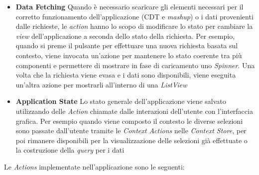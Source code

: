 \begin{itemize}
	\item \textbf{Data Fetching}
	Quando è necessario scaricare gli elementi necessari per il corretto funzionamento dell'applicazione (CDT e \emph{mashup}) o i dati provenienti dalle richieste, le \emph{action} hanno lo scopo di modificare lo stato per cambiare la \emph{view} dell'applicazione a seconda dello stato della richiesta.
	Per esempio, quando si preme il pulsante per effettuare una nuova richiesta basata sul contesto, viene invocata un'azione per mantenere lo stato coerente tra più componenti e permettere di mostrare in fase di caricamento uno \emph{Spinner}. Una volta che la richiesta viene evasa e i dati sono disponibili, viene eseguita un’altra azione per mostrarli all’interno di una \emph{ListView}
	\item \textbf{Application State}
	Lo stato generale dell'applicazione viene salvato utilizzando delle \emph{Action} chiamate dalle interazioni dell'utente con l'interfaccia grafica. Per esempio quando viene composto il contesto le diverse selezioni sono passate dall'utente tramite le \emph{Context Actions} nelle \emph{Context Store}, per poi rimanere disponibili per la visualizzazione delle selezioni già effettuate o la costruzione della \emph{query} per i dati
\end{itemize}	

Le \emph{Actions} implementate nell'applicazione sono le seguenti:

